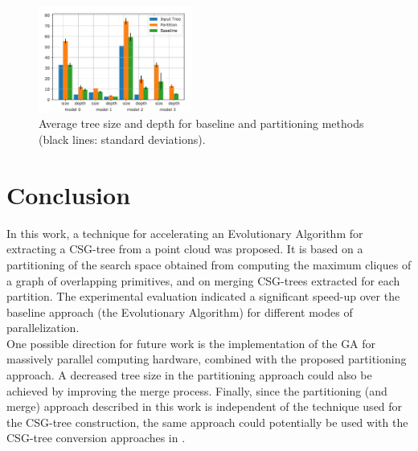 \begin{figure}[htb]
	\centering
	\includegraphics[width=0.45\textwidth]{figures/g2.pdf}
	\caption{Average tree size and depth for baseline and partitioning methods (black lines: standard deviations).}
	\label{fig:graph2}
\end{figure}
\section{Conclusion}
\label{sec:conclusion}
In this work, a technique for accelerating an Evolutionary Algorithm for extracting 
a \ac{CSG}-tree from a point cloud was proposed. It is based on a partitioning of the search space obtained 
from computing the maximum cliques of a graph of overlapping primitives, and on merging \ac{CSG}-trees 
extracted for each partition. 
The experimental evaluation indicated a significant speed-up over the baseline approach (the Evolutionary Algorithm) for different modes of parallelization.
\\
One possible direction for future work is 
the implementation of the \ac{GA} for massively parallel computing hardware, combined with the proposed partitioning approach. 
A decreased tree size in the partitioning approach could also be achieved by improving the merge process.
Finally, since the partitioning (and merge) approach described in this work is independent of the technique used for the \ac{CSG}-tree construction, the same approach could potentially be used with the \ac{CSG}-tree conversion approaches in \cite{shapiro1991construction,buchele2004three}. 
